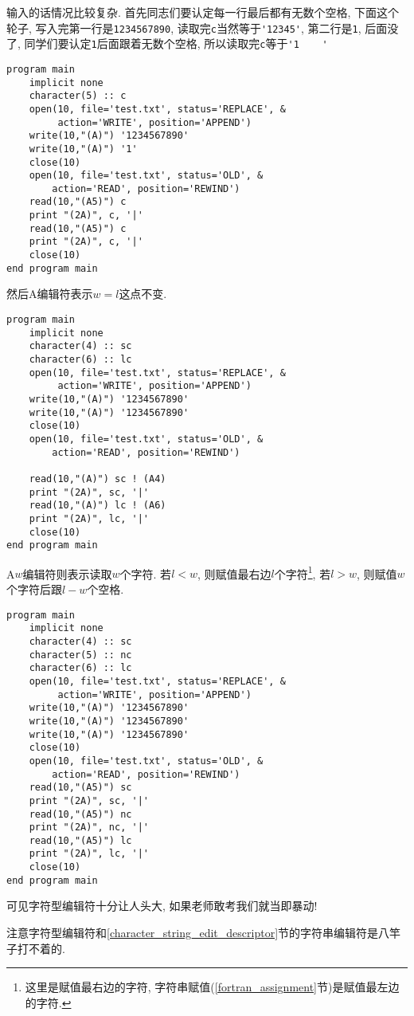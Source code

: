 输入的话情况比较复杂. 首先同志们要认定每一行最后都有无数个空格, 下面这个轮子, 写入完第一行是\verb|1234567890|, 读取完\verb|c|当然等于\verb|'12345'|, 第二行是\verb|1|, 后面没了, 同学们要认定\verb|1|后面跟着无数个空格, 所以读取完\verb|c|等于\verb|'1    '|
\begin{verbatim}
program main
    implicit none
    character(5) :: c
    open(10, file='test.txt', status='REPLACE', &
         action='WRITE', position='APPEND')
    write(10,"(A)") '1234567890'
    write(10,"(A)") '1'
    close(10)
    open(10, file='test.txt', status='OLD', &
        action='READ', position='REWIND')
    read(10,"(A5)") c
    print "(2A)", c, '|'
    read(10,"(A5)") c
    print "(2A)", c, '|'
    close(10)
end program main
\end{verbatim}
然后A编辑符表示$w=l$这点不变.
\begin{verbatim}
program main
    implicit none
    character(4) :: sc
    character(6) :: lc
    open(10, file='test.txt', status='REPLACE', &
         action='WRITE', position='APPEND')
    write(10,"(A)") '1234567890'
    write(10,"(A)") '1234567890'
    close(10)
    open(10, file='test.txt', status='OLD', &
        action='READ', position='REWIND')

    read(10,"(A)") sc ! (A4)
    print "(2A)", sc, '|'
    read(10,"(A)") lc ! (A6)
    print "(2A)", lc, '|'
    close(10)
end program main
\end{verbatim}
A$w$编辑符则表示读取$w$个字符. 若$l<w$, 则赋值最右边$l$个字符\footnote{这里是赋值最右边的字符, 字符串赋值(\ref{fortran_assignment}节)是赋值最左边的字符.}, 若$l>w$, 则赋值$w$个字符后跟$l-w$个空格.
\begin{verbatim}
program main
    implicit none
    character(4) :: sc
    character(5) :: nc
    character(6) :: lc
    open(10, file='test.txt', status='REPLACE', &
         action='WRITE', position='APPEND')
    write(10,"(A)") '1234567890'
    write(10,"(A)") '1234567890'
    write(10,"(A)") '1234567890'
    close(10)
    open(10, file='test.txt', status='OLD', &
        action='READ', position='REWIND')
    read(10,"(A5)") sc
    print "(2A)", sc, '|'
    read(10,"(A5)") nc
    print "(2A)", nc, '|'
    read(10,"(A5)") lc
    print "(2A)", lc, '|'
    close(10)
end program main
\end{verbatim}

可见字符型编辑符十分让人头大, 如果老师敢考我们就当即暴动!

注意字符型编辑符和\ref{character_string_edit_descriptor}节的字符串编辑符是八竿子打不着的.

